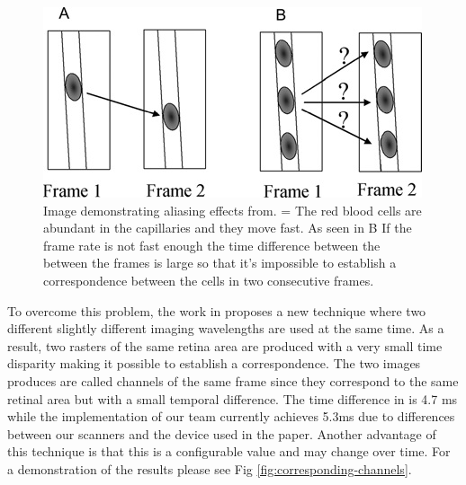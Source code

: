 \documentclass[]{article}
\begin{document}
\begin{figure}[ht]
	\includegraphics[width=\textwidth]{aliasing-effect.jpg}
	\caption{Image demonstrating aliasing effects from\cite{japee_automated_2005}. =
		 The red blood cells are abundant in the capillaries and they move fast.
	     As seen in B If the frame rate is not fast enough the time difference between the 
     	 between the frames is large so that it's impossible to establish a correspondence 
     	 between the cells in two consecutive frames.}
	\label{fig:aliasing-effect}
\end{figure}

To overcome this problem, the work in\cite{castro_rapid_2016} proposes a new technique where two different slightly different imaging wavelengths are used at the same time.
As a result, two rasters of the same retina area are produced with a very small time disparity making it possible to establish a correspondence.
The two images produces are called channels of the same frame since they correspond to the same retinal area but with a small temporal difference.
The time difference in\cite{castro_rapid_2016} is  4.7 ms while the implementation of our team currently achieves 5.3ms due to differences between our scanners and the device used in the paper.
Another advantage of this technique is that this is a configurable value and may change over time.
For a demonstration of the results please see Fig \ref{fig:corresponding-channels}.
\end{document}
